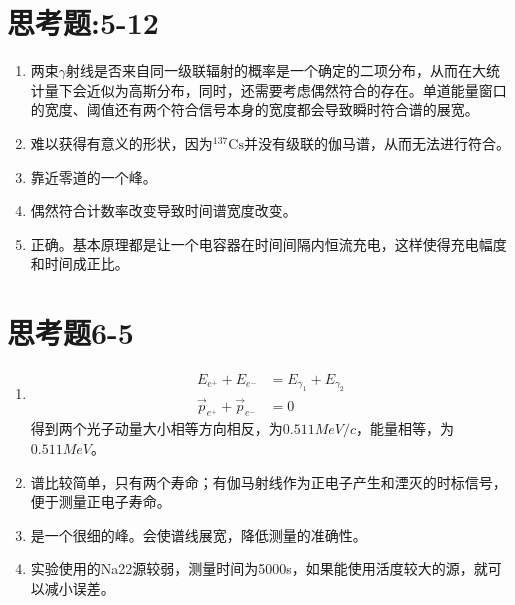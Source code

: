 \documentclass{article}
\begin{document}
    \section{思考题:5-12}
    \begin{enumerate}
        \item 两束$\gamma$射线是否来自同一级联辐射的概率是一个确定的二项分布，从而在大统计量下会近似为高斯分布，同时，还需要考虑偶然符合的存在。单道能量窗口的宽度、阈值还有两个符合信号本身的宽度都会导致瞬时符合谱的展宽。
        \item 难以获得有意义的形状，因为$^{137}\text{Cs}$并没有级联的伽马谱，从而无法进行符合。
        \item 靠近零道的一个峰。
        \item 偶然符合计数率改变导致时间谱宽度改变。
        \item 正确。基本原理都是让一个电容器在时间间隔内恒流充电，这样使得充电幅度和时间成正比。
    \end{enumerate}
    \section{思考题6-5}
    \begin{enumerate}
        \item \begin{equation}
            \begin{aligned}
                E_{e^+} + E_{e^-} &= E_{\gamma_1} + E_{\gamma_2}\\
                \vec{p}_{e^+} + \vec{p}_{e^-} &= 0 
            \end{aligned}
        \end{equation}
        得到两个光子动量大小相等方向相反，为$0.511\si{MeV}/c$，能量相等，为$0.511\si{MeV}$。
        \item 谱比较简单，只有两个寿命；有伽马射线作为正电子产生和湮灭的时标信号，便于测量正电子寿命。
        \item 是一个很细的峰。会使谱线展宽，降低测量的准确性。
        \item 实验使用的Na22源较弱，测量时间为5000s，如果能使用活度较大的源，就可以减小误差。
    \end{enumerate}
\end{document}
